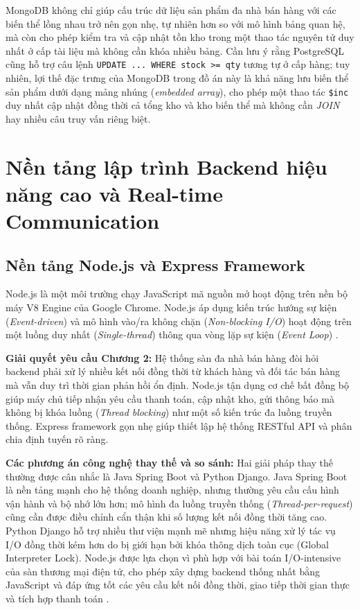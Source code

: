 \documentclass[../DoAn.tex]{subfiles}
\begin{document}
MongoDB không chỉ giúp cấu trúc dữ liệu sản phẩm đa nhà bán hàng với các biến thể lồng nhau trở nên gọn nhẹ, tự nhiên hơn so với mô hình bảng quan hệ, mà còn cho phép kiểm tra và cập nhật tồn kho trong một thao tác nguyên tử duy nhất ở cấp tài liệu mà không cần khóa nhiều bảng. Cần lưu ý rằng PostgreSQL cũng hỗ trợ câu lệnh \texttt{UPDATE ... WHERE stock >= qty} tương tự ở cấp hàng; tuy nhiên, lợi thế đặc trưng của MongoDB trong đồ án này là khả năng lưu biến thể sản phẩm dưới dạng mảng nhúng (\textit{embedded array}), cho phép một thao tác \texttt{\$inc} duy nhất cập nhật đồng thời cả tổng kho và kho biến thể mà không cần \textit{JOIN} hay nhiều câu truy vấn riêng biệt.

\section{Nền tảng lập trình Backend hiệu năng cao và Real-time Communication}
\label{section:3.2}

\subsection{Nền tảng Node.js và Express Framework}
Node.js là một môi trường chạy JavaScript mã nguồn mở hoạt động trên nền bộ máy V8 Engine của Google Chrome. Node.js áp dụng kiến trúc hướng sự kiện (\textit{Event-driven}) và mô hình vào/ra không chặn (\textit{Non-blocking I/O}) hoạt động trên một luồng duy nhất (\textit{Single-thread}) thông qua vòng lặp sự kiện (\textit{Event Loop}) \cite{nodejs-eventloop}.

\textbf{Giải quyết yêu cầu Chương 2:}
Hệ thống sàn đa nhà bán hàng đòi hỏi backend phải xử lý nhiều kết nối đồng thời từ khách hàng và đối tác bán hàng mà vẫn duy trì thời gian phản hồi ổn định. Node.js tận dụng cơ chế bất đồng bộ giúp máy chủ tiếp nhận yêu cầu thanh toán, cập nhật kho, gửi thông báo mà không bị khóa luồng (\textit{Thread blocking}) như một số kiến trúc đa luồng truyền thống. Express framework gọn nhẹ giúp thiết lập hệ thống RESTful API và phân chia định tuyến rõ ràng.

\textbf{Các phương án công nghệ thay thế và so sánh:}
Hai giải pháp thay thế thường được cân nhắc là Java Spring Boot và Python Django. Java Spring Boot là nền tảng mạnh cho hệ thống doanh nghiệp, nhưng thường yêu cầu cấu hình vận hành và bộ nhớ lớn hơn; mô hình đa luồng truyền thống (\textit{Thread-per-request}) cũng cần được điều chỉnh cẩn thận khi số lượng kết nối đồng thời tăng cao. Python Django hỗ trợ nhiều thư viện mạnh mẽ nhưng hiệu năng xử lý tác vụ I/O đồng thời kém hơn do bị giới hạn bởi khóa thông dịch toàn cục (Global Interpreter Lock). Node.js được lựa chọn vì phù hợp với bài toán I/O-intensive của sàn thương mại điện tử, cho phép xây dựng backend thống nhất bằng JavaScript và đáp ứng tốt các yêu cầu kết nối đồng thời, giao tiếp thời gian thực và tích hợp thanh toán \cite{springboot-vs-nodejs}.
\end{document}
